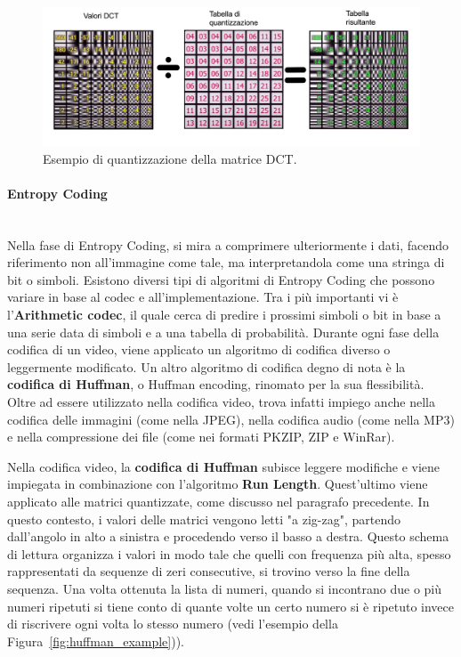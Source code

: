\documentclass[a4paper,12pt, oneside]{article}
\begin{document}
\begin{figure}[h]
    \centering
    \includegraphics[width=1\textwidth]{images/quantization-example.png}
    \caption{Esempio di quantizzazione della matrice DCT.}
    \label{fig:quantization_example}
\end{figure}

\paragraph{Entropy Coding}\hphantom{A}\\
Nella fase di Entropy Coding, si mira a comprimere ulteriormente i dati, facendo riferimento non
all'immagine come tale, ma interpretandola come una stringa di bit o simboli. Esistono diversi tipi di
algoritmi di Entropy Coding che possono variare in base al codec e all'implementazione.
Tra i più importanti vi è l'\textbf{Arithmetic codec}, il quale cerca di predire i prossimi
simboli o bit in base a una serie data di simboli e a una tabella di probabilità. Durante ogni fase
della codifica di un video, viene applicato un algoritmo di codifica diverso o leggermente
modificato. Un altro algoritmo di codifica degno di nota è la \textbf{codifica di Huffman}, o
Huffman encoding, rinomato per la sua flessibilità. Oltre ad essere utilizzato nella codifica video,
trova infatti impiego anche nella codifica delle immagini (come nella JPEG), nella codifica audio
(come nella MP3) e nella compressione dei file (come nei formati PKZIP, ZIP e WinRar).

Nella codifica video, la \textbf{codifica di Huffman} subisce leggere modifiche e viene impiegata
in combinazione con l'algoritmo \textbf{Run Length}. Quest'ultimo viene applicato alle matrici
quantizzate, come discusso nel paragrafo precedente. In questo contesto, i valori delle matrici vengono
letti "a zig-zag", partendo dall'angolo in alto a sinistra e procedendo verso il basso a destra.
Questo schema di lettura organizza i valori in modo tale che quelli con frequenza più alta, spesso 
rappresentati da sequenze di zeri consecutive, si trovino verso la fine della sequenza. Una volta ottenuta
la lista di numeri, quando si incontrano due o più numeri ripetuti si tiene conto di quante volte un certo
numero si è ripetuto invece di riscrivere ogni volta lo stesso numero (vedi l'esempio della
Figura~\ref{fig:huffman_example})).
\end{document}
